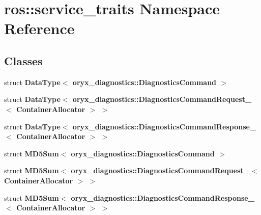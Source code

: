 \section{ros\-:\-:service\-\_\-traits \-Namespace \-Reference}
\label{namespaceros_1_1service__traits}
\subsection*{\-Classes}
\begin{DoxyCompactItemize}
\item 
struct {\bf \-Data\-Type$<$ oryx\-\_\-diagnostics\-::\-Diagnostics\-Command $>$}
\item 
struct {\bf \-Data\-Type$<$ oryx\-\_\-diagnostics\-::\-Diagnostics\-Command\-Request\-\_\-$<$ Container\-Allocator $>$ $>$}
\item 
struct {\bf \-Data\-Type$<$ oryx\-\_\-diagnostics\-::\-Diagnostics\-Command\-Response\-\_\-$<$ Container\-Allocator $>$ $>$}
\item 
struct {\bf \-M\-D5\-Sum$<$ oryx\-\_\-diagnostics\-::\-Diagnostics\-Command $>$}
\item 
struct {\bf \-M\-D5\-Sum$<$ oryx\-\_\-diagnostics\-::\-Diagnostics\-Command\-Request\-\_\-$<$ Container\-Allocator $>$ $>$}
\item 
struct {\bf \-M\-D5\-Sum$<$ oryx\-\_\-diagnostics\-::\-Diagnostics\-Command\-Response\-\_\-$<$ Container\-Allocator $>$ $>$}
\end{DoxyCompactItemize}
